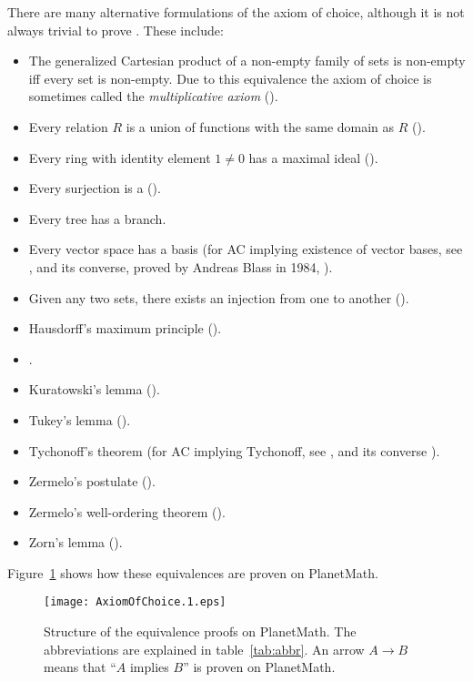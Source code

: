 \documentclass[12pt]{article}
\begin{document}
There are many alternative formulations of the axiom of choice, although it is not always trivial to prove . These include:
\begin{itemize}
\item The generalized Cartesian product of a non-empty family of sets is non-empty iff every set is non-empty.  Due to this equivalence the axiom of choice is sometimes called the \emph{multiplicative axiom} ().
\item Every relation $R$ is a union of functions with the same domain as $R$ ().
\item Every ring with identity element $1\neq 0$ has a maximal ideal ().
\item Every surjection is a  ().
\item Every tree has a branch.
\item Every vector space has a basis (for AC implying existence of vector bases, see , and its converse, proved by Andreas Blass in 1984, ).
\item Given any two sets, there exists an injection from one to another ().
\item Hausdorff's maximum principle ().
\item {}.
\item Kuratowski's lemma ().
\item Tukey's lemma ().
\item Tychonoff's theorem (for AC implying Tychonoff, see , and its converse ).
\item Zermelo's postulate ().
\item Zermelo's well-ordering theorem ().
\item Zorn's lemma ().
\end{itemize}


Figure~\ref{fig:implications} shows how these equivalences are proven on PlanetMath.

\begin{figure}
\label{fig:implications}
\begin{center}
\texttt{[image: AxiomOfChoice.1.eps]}
\end{center}
\sf\caption{Structure of the equivalence proofs on PlanetMath. The
abbreviations are explained in table~\ref{tab:abbr}\@. An arrow
$A\rightarrow B$ means that ``$A$ implies $B$'' is proven on
PlanetMath.}
\end{figure}
\end{document}

